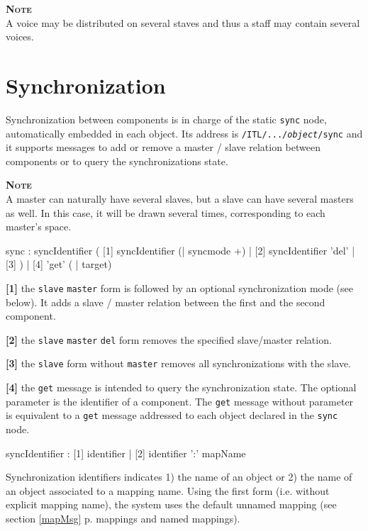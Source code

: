 \documentclass[a4paper,twoside]{report}
\newcommand{\toplevel}[1]	{\chapter{#1}}
\newcommand{\fullref}[1]	{\ref{#1} p.\pageref{#1}}
\newcommand{\OSC}[1]		{\texttt{#1}}
\newcommand{\note}	[1]		{\vspace{2mm}\textbf{\hspace{-0.9cm}\textbf{\textsc{Note #1}}}}
\let\olditemize\itemize
\let\oldenditemize\enditemize
\renewenvironment{itemize} 	{\olditemize \setlength{\itemsep}{1mm}}{\oldenditemize}
\begin{document}
\note{} \\
A voice may be distributed on several staves and thus a staff may contain several voices.


\toplevel{Synchronization}
\label{syncmsg}

Synchronization between components is in charge of the static \OSC{sync} node, automatically embedded in each object. Its address is \OSC{/ITL/.../\textit{object}/sync} and it supports messages to add or remove a master / slave relation between components or to query the synchronizations state.

\note{} \\
A master can naturally have several slaves, but a slave can have several masters as well. In this case, it will be drawn several times, corresponding to each master's space.

\begin{rail}
sync : syncIdentifier 
	 ( [1] syncIdentifier (| syncmode +) 
	   | [2] syncIdentifier 'del'
	   | [3] )
	   | [4] 'get' ( | target)
\end{rail}


\begin{itemize}
\item \textbf{[1]} the \OSC{slave} \OSC{master} form is followed by an optional synchronization mode (see below). It adds a slave / master relation between the first and the second component.
\item \textbf{[2]} the \OSC{slave} \OSC{master} \OSC{del} form removes the specified slave/master relation.
\item \textbf{[3]} the \OSC{slave} form without \OSC{master} removes all synchronizations with the slave.
\item \textbf{[4]} the \OSC{get} message is intended to query the synchronization state. The optional parameter is the identifier of a component. The \OSC{get} message without parameter is equivalent to a \OSC{get} message addressed to each object declared in the \OSC{sync} node.
\end{itemize}

\begin{rail}
syncIdentifier : [1] identifier 
		| [2] identifier ':' mapName
\end{rail}

Synchronization identifiers indicates 1) the name of an object or 2) the name of an object associated to a mapping name. Using the first form (i.e. without explicit mapping name), the system uses the default unnamed mapping (see section \fullref{mapMsg} mappings and named mappings).
\end{document}
